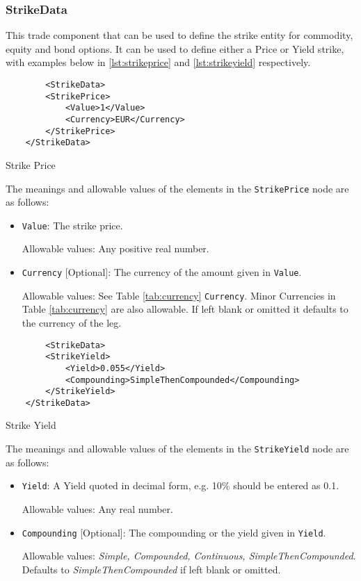 \subsubsection{StrikeData}
\label{ss:strikedata}

This trade component that can be used to define the strike entity for commodity, equity and bond options. It can be used to define either a Price or Yield strike, with examples below in  \ref{lst:strikeprice} and \ref{lst:strikeyield} respectively.

\begin{listing}[H]
\begin{verbatim}
        <StrikeData>
		<StrikePrice>
			<Value>1</Value>
			<Currency>EUR</Currency>
		</StrikePrice>
	</StrikeData>
\end{verbatim}
\caption{Strike Price}
\label{lst:strikeprice}
\end{listing}

The meanings and allowable values of the elements in the \lstinline!StrikePrice! node are as follows:

\begin{itemize}

\item \lstinline!Value!: The strike price.

Allowable values: Any positive real number.

\item \lstinline!Currency! [Optional]: The currency of the amount given in \lstinline!Value!.

Allowable values: See Table \ref{tab:currency} \lstinline!Currency!. Minor Currencies in Table \ref{tab:currency} are also allowable. If left blank or omitted it defaults to the currency of the leg.

\end{itemize}

\begin{listing}[H]
\begin{verbatim}
        <StrikeData>
		<StrikeYield>
			<Yield>0.055</Yield>
			<Compounding>SimpleThenCompounded</Compounding>
		</StrikeYield>
	</StrikeData>
\end{verbatim}
\caption{Strike Yield}
\label{lst:strikeyield}
\end{listing}

The meanings and allowable values of the elements in the \lstinline!StrikeYield! node are as follows:

\begin{itemize}

\item \lstinline!Yield!: A Yield quoted in decimal form, e.g. 10\% should be entered as 0.1.

Allowable values: Any real number.

\item \lstinline!Compounding! [Optional]: The compounding or the yield given in  \lstinline!Yield!. 

Allowable values: {\em Simple, Compounded, Continuous, SimpleThenCompounded}. Defaults to \emph{SimpleThenCompounded} if left blank or omitted.

\end{itemize}
